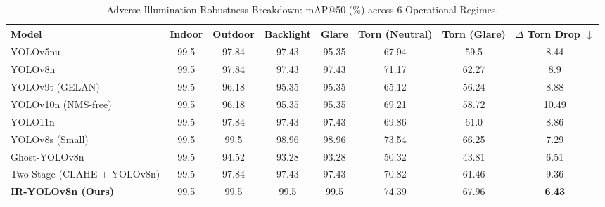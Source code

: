 \begin{table}[tb]
\centering
\caption{Adverse Illumination Robustness Breakdown: mAP@50 (\%) across 6 Operational Regimes.}
\label{tab:condition_breakdown}
\scriptsize
\begin{tabular}{lcccccc|c}
\toprule
\textbf{Model} & \textbf{Indoor} & \textbf{Outdoor} & \textbf{Backlight} & \textbf{Glare} & \textbf{Torn (Neutral)} & \textbf{Torn (Glare)} & \textbf{$\Delta$ Torn Drop $\downarrow$} \\
\midrule
YOLOv5nu & 99.5 & 97.84 & 97.43 & 95.35 & 67.94 & 59.5 & 8.44 \\
YOLOv8n & 99.5 & 97.84 & 97.43 & 97.43 & 71.17 & 62.27 & 8.9 \\
YOLOv9t (GELAN) & 99.5 & 96.18 & 95.35 & 95.35 & 65.12 & 56.24 & 8.88 \\
YOLOv10n (NMS-free) & 99.5 & 96.18 & 95.35 & 95.35 & 69.21 & 58.72 & 10.49 \\
YOLO11n & 99.5 & 97.84 & 97.43 & 97.43 & 69.86 & 61.0 & 8.86 \\
YOLOv8s (Small) & 99.5 & 99.5 & 98.96 & 98.96 & 73.54 & 66.25 & 7.29 \\
Ghost-YOLOv8n & 99.5 & 94.52 & 93.28 & 93.28 & 50.32 & 43.81 & 6.51 \\
Two-Stage (CLAHE + YOLOv8n) & 99.5 & 97.84 & 97.43 & 97.43 & 70.82 & 61.46 & 9.36 \\
\textbf{IR-YOLOv8n (Ours)} & 99.5 & 99.5 & 99.5 & 99.5 & 74.39 & 67.96 & \textbf{6.43} \\
\bottomrule
\end{tabular}
\end{table}
